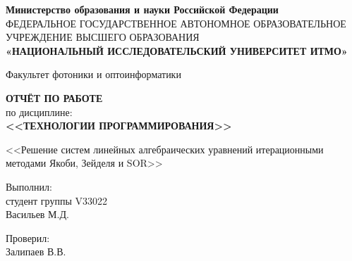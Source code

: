 \thispagestyle{empty}

\begin{center}
    \textbf{Министерство образования и науки Российской Федерации} \\
    ФЕДЕРАЛЬНОЕ ГОСУДАРСТВЕННОЕ АВТОНОМНОЕ ОБРАЗОВАТЕЛЬНОЕ УЧРЕЖДЕНИЕ ВЫСШЕГО ОБРАЗОВАНИЯ \\
    \textbf{\small{«НАЦИОНАЛЬНЫЙ ИССЛЕДОВАТЕЛЬСКИЙ УНИВЕРСИТЕТ ИТМО»}}
    \end{center}
    
\begin{center}
    Факультет фотоники и оптоинформатики
\end{center}

\vspace{0.1\paperheight}

\begin{center}
    \textbf{ОТЧЁТ ПО РАБОТЕ} \\
    по дисциплине: \\
    \textbf{<<ТЕХНОЛОГИИ ПРОГРАММИРОВАНИЯ>>}
\end{center}

\begin{center}
    <<Решение систем линейных алгебраических уравнений итерационными методами Якоби, Зейделя и SOR>>
\end{center}

\vspace{0.1\paperheight}

\begin{flushright}
    Выполнил: \\
    студент группы V33022 \\
    Васильев М.Д.
\end{flushright}

\begin{flushright}
    Проверил: \\
    Залипаев В.В.
\end{flushright}

\vspace{0pt plus4fill}

\newpage